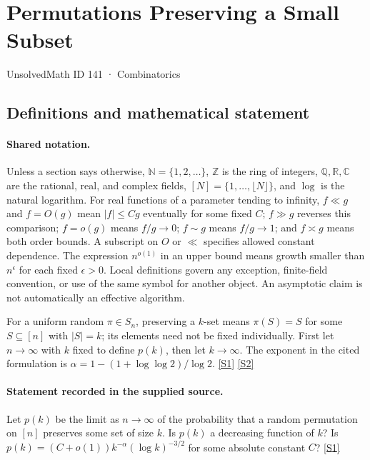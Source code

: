 \documentclass[11pt,a4paper]{article}
\newcommand{\N}{\mathbb{N}}
\newcommand{\Z}{\mathbb{Z}}
\newcommand{\Q}{\mathbb{Q}}
\newcommand{\R}{\mathbb{R}}
\newcommand{\C}{\mathbb{C}}
\newcommand{\sref}[2]{\hyperlink{source:#1:#2}{[S#2]}}
\begin{document}

\setcounter{section}{140}

\section{Permutations Preserving a Small Subset}\label{141}

{\small\sffamily UnsolvedMath ID 141 · Combinatorics}

\subsection{Definitions and mathematical statement}

\paragraph{Shared notation.}Unless a section says otherwise, $\N=\{1,2,\ldots\}$,
$\Z$ is the ring of integers, $\Q,\R,\C$ are the rational, real, and complex
fields, $[N]=\{1,\ldots,\lfloor N\rfloor\}$, and $\log$ is the natural
logarithm. For real functions of a parameter tending to infinity,
$f\ll g$ and $f=O(g)$ mean $|f|\leq Cg$ eventually for some fixed $C$;
$f\gg g$ reverses this comparison; $f=o(g)$ means $f/g\to0$;
$f\sim g$ means $f/g\to1$; and $f\asymp g$ means both order bounds.
A subscript on $O$ or $\ll$ specifies allowed constant dependence.
The expression $n^{o(1)}$ in an upper bound means growth smaller than
$n^\epsilon$ for each fixed $\epsilon>0$. Local definitions govern any
exception, finite-field convention, or use of the same symbol for another
object. An asymptotic claim is not automatically an effective algorithm.



For a uniform random $\pi\in S_n$, preserving a $k$-set means $\pi(S)=S$ for some $S\subseteq[n]$ with $|S|=k$; its elements need not be fixed individually. First let $n\to\infty$ with $k$ fixed to define $p(k)$, then let $k\to\infty$. The exponent in the cited formulation is $\alpha=1-(1+\log\log2)/\log2$. \sref{141}{1} \sref{141}{2}

\paragraph{Statement recorded in the supplied source.}
Let $p(k)$ be the limit as $n \to \infty$ of the probability that a random permutation on $[n]$ preserves some set of size $k$. Is $p(k)$ a decreasing function of $k$? Is $p(k) = (C + o(1))k^{-\alpha}(\log k)^{-3/2}$ for some absolute constant $C$? \sref{141}{1}
\end{document}
